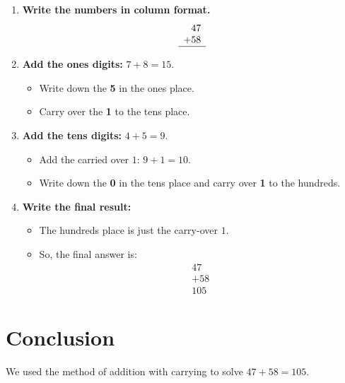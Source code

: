\documentclass{article}
\begin{document}
\begin{enumerate}[label=Step \arabic*:, leftmargin=*]
    \item \textbf{Write the numbers in column format.}
          \[
              \begin{array}{r}
                  47  \\
                  +58 \\
                  \hline
              \end{array}
          \]

    \item \textbf{Add the ones digits:} $7 + 8 = 15$.

          \begin{itemize}
              \item Write down the \textbf{5} in the ones place.
              \item Carry over the \textbf{1} to the tens place.
          \end{itemize}

    \item \textbf{Add the tens digits:} $4 + 5 = 9$.

          \begin{itemize}
              \item Add the carried over $1$: $9 + 1 = 10$.
              \item Write down the \textbf{0} in the tens place and carry over \textbf{1} to the hundreds.
          \end{itemize}

    \item \textbf{Write the final result:}

          \begin{itemize}
              \item The hundreds place is just the carry-over $1$.
              \item So, the final answer is:
                    \[
                        \begin{array}{r}
                            47  \\
                            +58 \\
                            \hline
                            105
                        \end{array}
                    \]
          \end{itemize}
\end{enumerate}

\section*{Conclusion}
We used the method of addition with carrying to solve $47 + 58 = 105$.
\end{document}
